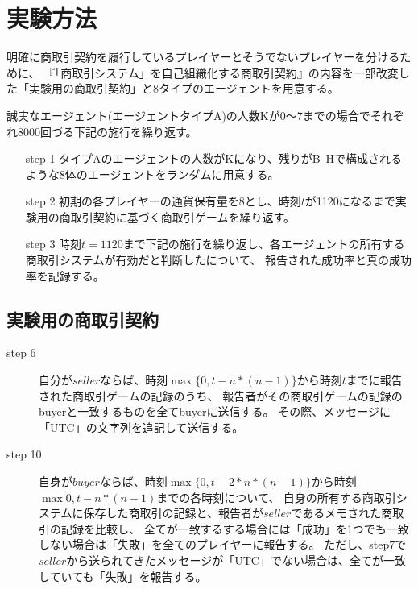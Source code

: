 \section{実験方法}
  明確に商取引契約を履行しているプレイヤーとそうでないプレイヤーを分けるために、
  『「商取引システム」を自己組織化する商取引契約』の内容を一部改変した「実験用の商取引契約」と8タイプのエージェントを用意する。

  誠実なエージェント(エージェントタイプA)の人数Kが0〜7までの場合でそれぞれ8000回づる下記の施行を繰り返す。

  \begin{itemize}
    \item[step 1] タイプAのエージェントの人数がKになり、残りがB~Hで構成されるような8体のエージェントをランダムに用意する。
    \item[step 2] 初期の各プレイヤーの通貨保有量を8とし、時刻$t$が1120になるまで実験用の商取引契約に基づく商取引ゲームを繰り返す。 
    \item[step 3] 時刻$t=1120$まで下記の施行を繰り返し、各エージェントの所有する商取引システムが有効だと判断したについて、
    報告された成功率と真の成功率を記録する。
  \end{itemize}

  \subsection{実験用の商取引契約}
    \begin{description}
      \item[step 6] 自分が$seller$ならば、時刻$\max\{0, t-n*(n-1)\}$から時刻$t$までに報告された商取引ゲームの記録のうち、
        報告者がその商取引ゲームの記録のbuyerと一致するものを全てbuyerに送信する。
        その際、メッセージに「UTC」の文字列を追記して送信する。
      \item[step 10] 自身が$buyer$ならば、時刻$\max\{0, t-2*n*(n-1)\}$から時刻$\max{0, t-n*(n-1)}$までの各時刻について、
        自身の所有する商取引システムに保存した商取引の記録と、報告者が$seller$であるメモされた商取引の記録を比較し、
        全てが一致するする場合には「成功」を1つでも一致しない場合は「失敗」を全てのプレイヤーに報告する。
        ただし、step7で$seller$から送られてきたメッセージが「UTC」でない場合は、全てが一致していても「失敗」を報告する。
    \end{description}

